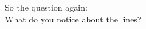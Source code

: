 \documentclass[preview]{standalone}
\begin{document}
\begin{center}
So the question again:\\What do you notice about the lines?
\end{center}
\end{document}
